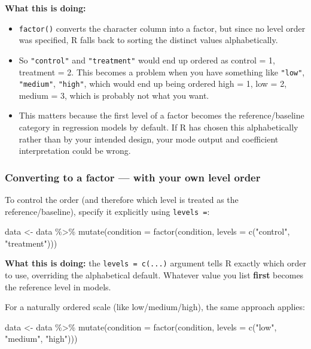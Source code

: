 \documentclass[
  letterpaper,
  DIV=11,
  numbers=noendperiod]{scrreprt}
\newenvironment{Shaded}{\begin{snugshade}}{\end{snugshade}}
\newcommand{\AttributeTok}[1]{\textcolor[rgb]{0.40,0.45,0.13}{#1}}
\newcommand{\FunctionTok}[1]{\textcolor[rgb]{0.28,0.35,0.67}{#1}}
\newcommand{\NormalTok}[1]{\textcolor[rgb]{0.00,0.23,0.31}{#1}}
\newcommand{\OtherTok}[1]{\textcolor[rgb]{0.00,0.23,0.31}{#1}}
\newcommand{\SpecialCharTok}[1]{\textcolor[rgb]{0.37,0.37,0.37}{#1}}
\newcommand{\StringTok}[1]{\textcolor[rgb]{0.13,0.47,0.30}{#1}}
\begin{document}
\textbf{What this is doing:}

\begin{itemize}
\item
  \texttt{factor()} converts the character column into a factor, but
  since no level order was specified, R falls back to sorting the
  distinct values alphabetically.
\item
  So \texttt{"control"} and \texttt{"treatment"} would end up ordered as
  control = 1, treatment = 2. This becomes a problem when you have
  something like \texttt{"low"}, \texttt{"medium"}, \texttt{"high"},
  which would end up being ordered high = 1, low = 2, medium = 3, which
  is probably not what you want.
\item
  This matters because the first level of a factor becomes the
  reference/baseline category in regression models by default. If R has
  chosen this alphabetically rather than by your intended design, your
  mode output and coefficient interpretation could be wrong.
\end{itemize}

\subsubsection{Converting to a factor --- with your own level
order}\label{converting-to-a-factor-with-your-own-level-order}

To control the order (and therefore which level is treated as the
reference/baseline), specify it explicitly using \texttt{levels\ =}:

\begin{Shaded}
\begin{Highlighting}[]
\NormalTok{data }\OtherTok{\textless{}{-}}\NormalTok{ data }\SpecialCharTok{\%\textgreater{}\%}
  \FunctionTok{mutate}\NormalTok{(}\AttributeTok{condition =} \FunctionTok{factor}\NormalTok{(condition, }\AttributeTok{levels =} \FunctionTok{c}\NormalTok{(}\StringTok{"control"}\NormalTok{, }\StringTok{"treatment"}\NormalTok{)))}
\end{Highlighting}
\end{Shaded}

\textbf{What this is doing:} the \texttt{levels\ =\ c(...)} argument
tells R exactly which order to use, overriding the alphabetical default.
Whatever value you list \textbf{first} becomes the reference level in
models.

For a naturally ordered scale (like low/medium/high), the same approach
applies:

\begin{Shaded}
\begin{Highlighting}[]
\NormalTok{data }\OtherTok{\textless{}{-}}\NormalTok{ data }\SpecialCharTok{\%\textgreater{}\%}
  \FunctionTok{mutate}\NormalTok{(}\AttributeTok{condition =} \FunctionTok{factor}\NormalTok{(condition, }\AttributeTok{levels =} \FunctionTok{c}\NormalTok{(}\StringTok{"low"}\NormalTok{, }\StringTok{"medium"}\NormalTok{, }\StringTok{"high"}\NormalTok{)))}
\end{Highlighting}
\end{Shaded}
\end{document}

